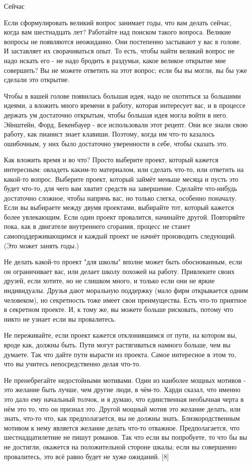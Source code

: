\documentclass[ebook,12pt,oneside,openany]{memoir}
\begin{document}
Сейчас

Если сформулировать великий вопрос занимает годы, что вам делать
сейчас, когда вам шестнадцать лет? Работайте над поиском такого
вопроса. Великие вопросы не появляются неожиданно. Они постепенно
застывают у вас в голове. И заставляет их сворачиваться опыт. То есть,
чтобы найти великий вопрос не надо искать его - не надо бродить в
раздумьи, какое великое открытие мне совершить? Вы не можете ответить
на этот вопрос; если бы вы могли, вы бы уже сделали это открытие.

Чтобы в вашей голове появилась большая идея, надо не охотиться за
большими идеями, а вложить много времени в работу, которая интересует
вас, и в процессе держать ум достаточно открытым, чтобы большая идея
могла войти в него. Эйнштейн, Форд, Бекенбауер - все использовали этот
рецепт. Они все знали свою работу, как пианист знает клавиши. Поэтому,
когда им что-то казалось ошибочным, у них было достаточно уверенности
в себе, чтобы сказать это.

Как вложить время и во что? Просто выберите проект, который кажется
интересным: овладеть каким-то материалом, или сделать что-то, или
ответить на какой-то вопрос. Выберите проект, который займёт меньше
месяца и пусть это будет что-то, для чего вам хватит средств на
завершение. Сделайте что-нибудь достаточно сложное, чтобы напрячь вас,
но только слегка, особенно поначалу. Если вы выбираете между двумя
проектами, выбирайте тот, который кажется более увлекающим. Если один
проект провалится, начинайте другой. Повторяйте пока, как в двигателе
внутреннего сгорания, процесс не станет самоподдерживающимся и каждый
проект не начнёт производить следующий. (Это может занять годы.)

Не делать какой-то проект "для школы" вполне может быть обоснованным,
если он ограничивает вас, или делает школу похожей на работу.
Привлеките своих друзей, если хотите, но не слишком много, и только
если они не яркие индивидуалы. Друзья дают моральную поддержку (мало
фирм открывается одним человеком), но секретность тоже имеет свои
преимущества. Есть что-то приятное в секретном проекте. И, к тому же,
вы можете больше рисковать, потому что никто не узнает если вы
провалитесь.

Не переживайте, если проект кажется отклонившимся от пути, на котором
вы, вроде как, должны быть. Пути могут растягиваться намного больше,
чем вы думаете. Так что дайте пути вырасти из проекта. Самое
интересное в этом то, что вы учитесь непосредственно делая что-то.

Не пренебрегайте недостойными мотивами. Один из наиболее мощных
мотивов - это желание быть лучше, чем другие люди, в чём-то. Харди
сказал, что именно это дало ему начальный толчок, и я думаю, что
единственная необычная черта в нём это то, что он признал это. Другой
мощный мотив это желание делать, или знать, что-то что, как
предполагается, вы не должны знать. Близкородственным мотивом к нему
является желание делать что-то отважное. Предполагается, что
шестнадцатилетние не пишут романов. Так что если вы попробуете, то что
бы вы не достигли, окажется на положительной стороне шкалы; если вы
совершенно провалитесь, это всё равно будет не хуже ожиданий. [8]
\end{document}

